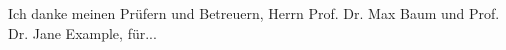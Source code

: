 \documentclass[
12pt, %
oneside, %
chapterinoneline,%
ngerman, %
onehalfspacing, %
draft=false, %
nolistspacing, %
headsepline %
]{MastersDoctoralThesis} %
\begin{document}
\setcounter{tocdepth}{2} %
\setcounter{secnumdepth}{2} %

{%
	\singlespacing
\tableofcontents %

\listoffigures %

\lstlistoflistings %

\listoftables %

\renewcommand*{\glsgroupskip}{\vspace{1.2\bigskipamount}}%
\printglossary	 %

}



\pagestyle{thesis} %

\begin{acknowledgements}
Ich danke meinen Prüfern und Betreuern, Herrn Prof. Dr. Max Baum und Prof. Dr. Jane Example, für...

\end{acknowledgements}
\mainmatter %






%



\end{document}
